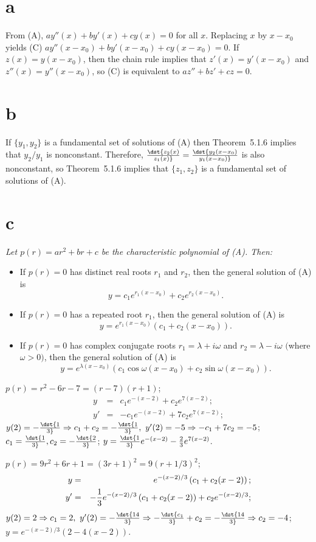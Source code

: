 \documentclass[dvips]{book}
\renewcommand{\exer}[1]{\par\medskip\;\noindent{\color{red}\bf #1.}}
\numberwithin{example}{section}
\numberwithin{equation}{section}
\numberwithin{theorem}{section}
\numberwithin{table}{section}
\numberwithin{figure}{section}
\begin{document}
\exer{5.2.22}
\part{a}
From (A), $ay''(x)+by'(x)+cy(x)=0$ for all $x$. Replacing $x$ by
$x-x_0$ yields (C) $ay''(x-x_0)+by'(x-x_0)+cy(x-x_0)=0$. If
$z(x)=y(x-x_0)$, then the chain rule implies that $z'(x)=y'(x-x_0)$
and $z''(x)=y''(x-x_0)$, so (C) is equivalent to $az''+bz'+cz=0$.


\part{b}  If  $\{y_1,y_2\}$  is a fundamental set of solutions of
(A) then Theorem~5.1.6  implies that
$y_2/y_1$ is nonconstant. Therefore,
$\dst{z_2(x)\over z_1(x)}=\dst{y_2(x-x_0)\over y_1(x-x_0)}$ is also
nonconstant, so Theorem~5.1.6 implies that  $\{z_1,z_2\}$ is a
fundamental set of solutions of (A).

\part{c}
\it Let $p(r)=ar^2+br+c$ be the characteristic polynomial of {\rm(A)}.
Then:
\begin{itemize}
\item
If $p(r)=0$  has distinct real roots $r_1$ and $r_2$, then the general
solution of {\rm(A)} is
$$
y=c_1e^{r_1(x-x_0)}+c_2e^{r_2(x-x_0)}.
$$
\item
If $p(r)=0$  has a repeated root  $r_1$, then
the general solution of {\rm(A)} is
$$
y=e^{r_1(x-x_0)}(c_1+c_2(x-x_0)).
$$
\item %
If $p(r)=0$  has complex conjugate roots $r_1=\lambda+i\omega$
and
$r_2=\lambda-i\omega$ $($where $\omega>0)$, then the general solution
of {\rm(A)} is
$$
y=e^{\lambda (x-x_0)}(c_1\cos\omega(x-x_0)+c_2\sin\omega(x-x_0)).
$$
\end{itemize} \rm

\exer{5.2.24}
$p(r)=r^2-6r-7=(r-7)(r+1)$;
\begin{eqnarray*}
y&=&c_1e^{-(x-2)}+c_2e^{7(x-2)};\\
y'&=&-c_1e^{-(x-2)}+7c_2e^{7(x-2)};
\end{eqnarray*}
$y(2)=-\dst{1\over3}\Rightarrow c_1+c_2=-\dst{1\over3},\
y'(2)=-5\Rightarrow -c_1+7c_2=-5$;\;
$c_1=\dst{1\over3}, c_2=-\dst{2\over3}$;\;
$y=\dst{1\over3}e^{-(x-2)}-{2\over3}e^{7(x-2)}$.

\exer{5.2.26}
$p(r)=9r^2+6r+1=(3r+1)^2=9(r+1/3)^2$;
\begin{eqnarray*}
y&=&e^{-(x-2)/3}\left(c_1+c_2(x-2)\right);\\
y'&=&-{1\over3}e^{-(x-2)/3}\left(c_1+c_2(x-2)\right)
+c_2e^{-(x-2)/3};
\end{eqnarray*}
$y(2)=2\Rightarrow c_1=2,\
y'(2)=-\dst{14\over3}\Rightarrow -\dst{c_1\over3}+c_2=-\dst{14\over3}
\Rightarrow c_2=-4$;\;
$y=e^{-(x-2)/3}\left(2-4(x-2)\right)$.
\end{document}
